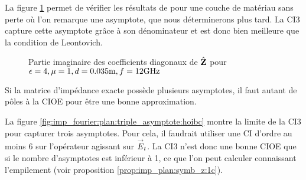      La figure \ref{fig:imp_fourier:plan:soudais:hoibc} permet de vérifier les résultats de \cite[p.~11]{soudais_3d_2017} pour une couche de matériau sans perte où l'on remarque une asymptote, que nous déterminerons plus tard.
      La CI3 capture cette asymptote grâce à son dénominateur et est donc bien meilleure que la condition de Leontovich.
      \begin{figure}[!hbt]
          \centering
          
          \caption[CIOE sur empilement de P.~Soudais p.~11]{Partie imaginaire des coefficients diagonaux de \(\hat{\mathbf{Z}}\) pour \(\epsilon = 4, \mu = 1, d=0.035\text{m}, f=12\text{GHz}\)}
          \label{fig:imp_fourier:plan:soudais:hoibc}
      \end{figure}
      \begin{table}[!hbt]
        \centering
        \caption{Coefficients associés à la figure \ref{fig:imp_fourier:plan:soudais:hoibc}}
        \label{tab:imp_fourier:plan:soudais:hoibc}
      \end{table}


      Si la matrice d'impédance exacte possède plusieurs asymptotes, il faut autant de pôles à la CIOE pour être une bonne approximation.

      La figure \ref{fig:imp_fourier:plan:triple_asymptote:hoibc} montre la limite de la CI3 pour capturer trois asymptotes. Pour cela, il faudrait utiliser une CI d'ordre au moins 6 sur l'opérateur agissant sur \({\overset{\rightarrow}{E}}_t\). La CI3 n'est donc une bonne CIOE que si le nombre d'asymptotes est inférieur à 1, ce que l'on peut calculer connaissant l'empilement (voir proposition \ref{prop:imp_plan:symb_z:1c}).

